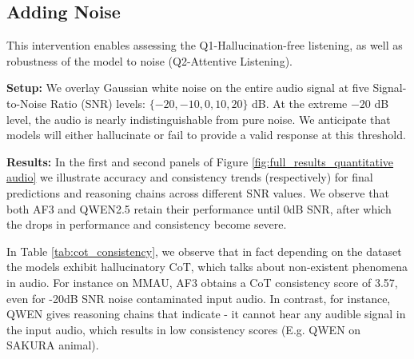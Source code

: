 

\subsection{Adding Noise}
\label{sec:study1}

This intervention enables assessing the Q1-Hallucination-free listening, as well as robustness of the model to noise (Q2-Attentive Listening).  

\noindent \textbf{Setup:} We overlay Gaussian white noise on the entire audio signal at five Signal-to-Noise Ratio (SNR) levels: $\{-20, -10, 0, 10, 20\}$ dB. At the extreme $-20$ dB level, the audio is nearly indistinguishable from pure noise. We anticipate that models will either hallucinate or fail to provide a valid response at this threshold. 



\noindent \textbf{Results:} In the first and second panels of Figure \ref{fig:full_results_quantitative audio} we illustrate accuracy and consistency trends (respectively) for final predictions and reasoning chains across different SNR values. We observe that both AF3 and QWEN2.5 retain their performance until 0dB SNR, after which the drops in performance and consistency become severe. 

In Table \ref{tab:cot_consistency}, we observe that in fact depending on the dataset the models exhibit hallucinatory CoT, which talks about non-existent phenomena in audio. For instance on MMAU, AF3 obtains a CoT consistency score of 3.57, even for -20dB SNR noise contaminated input audio. In contrast, for instance, QWEN gives reasoning chains that indicate - it cannot hear any audible signal in the input audio, which results in low consistency scores (E.g. QWEN on SAKURA animal).





